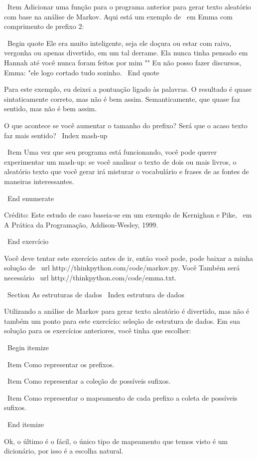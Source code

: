 \documentclass[10pt]{book}
\begin{document}
{{{{{{{{{\ Item Adicionar uma função para o programa anterior para gerar texto aleatório
com base na análise de Markov. Aqui está um exemplo de {\ em Emma}
com comprimento de prefixo 2:

\ Begin {quote}
Ele era muito inteligente, seja ele doçura ou estar com raiva, vergonha ou apenas
divertido, em um tal derrame. Ela nunca tinha pensado em Hannah até você
nunca foram feitos por mim "" Eu não posso fazer discursos, Emma: "ele logo cortado
tudo sozinho.
\ End {quote}

Para este exemplo, eu deixei a pontuação ligado às palavras.
O resultado é quase sintaticamente correto, mas não é bem assim.
Semanticamente, que quase faz sentido, mas não é bem assim.

O que acontece se você aumentar o tamanho do prefixo? Será que o acaso
texto faz mais sentido?
\ Index {mash-up}

\ Item Uma vez que seu programa está funcionando, você pode querer experimentar um mash-up:
se você analisar o texto de dois ou mais livros, o aleatório
texto que você gerar irá misturar o vocabulário e frases de
as fontes de maneiras interessantes.

\ End {enumerate}

Crédito: Este estudo de caso baseia-se em um exemplo de Kernighan e
Pike, {\ em A Prática da Programação}, Addison-Wesley, 1999.

\ End {} exercício

Você deve tentar este exercício antes de ir, então você pode, pode
baixar a minha solução de \ url {http://thinkpython.com/code/markov.py}. Você
Também será necessário \ url {http://thinkpython.com/code/emma.txt}.


\ Section {As estruturas de dados}
\ Index {estrutura de dados}

Utilizando a análise de Markov para gerar texto aleatório é divertido, mas não é
também um ponto para este exercício: seleção de estrutura de dados. Em sua
solução para os exercícios anteriores, você tinha que escolher:

\ Begin {itemize}

\ Item Como representar os prefixos.

\ Item Como representar a coleção de possíveis sufixos.

\ Item Como representar o mapeamento de cada prefixo
a coleta de possíveis sufixos.

\ End {itemize}

Ok, o último é o fácil, o único tipo de mapeamento que temos
visto é um dicionário, por isso é a escolha natural.

}}}}}}}}}
\end{document}
